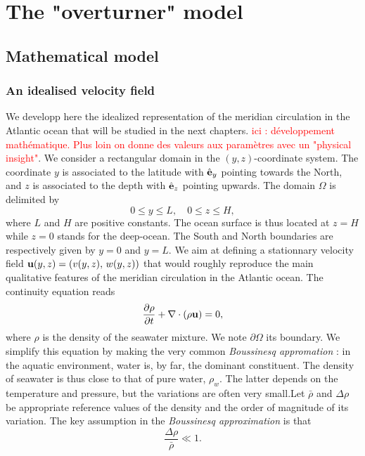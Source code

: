 \chapter{The "overturner" model}
\section{Mathematical model}
\subsection{An idealised velocity field}
We developp here the idealized representation of the meridian circulation in the Atlantic ocean that will be studied in the next chapters. \textcolor{red}{ici : développement mathématique. Plus loin on donne des valeurs aux paramètres avec un "physical insight"}. We consider a rectangular domain in the $(y,z)$-coordinate system. The coordinate $y$ is associated to the latitude with $\hat{\mathbf{e}}_y$ pointing towards the North, and $z$ is associated to the depth with $\hat{\mathbf{e}}_z$ pointing upwards. The domain $\Omega$ is delimited by
\begin{equation} 
	0 \le y \le L,\quad 0 \le z \le H,
\end{equation}
where $L$ and $H$ are positive constants. The ocean surface is thus located at $z = H$ while $z = 0$ stands for the deep-ocean. The South and North boundaries are respectively given by $y = 0$ and $y = L$. We aim at defining a stationnary velocity field $\mathbf u(y,z) = (v(y,z),\, w(y,z))$ that would roughly reproduce the main qualitative features of the meridian circulation in the Atlantic ocean. The continuity equation reads
\begin{equation} \label{eq:continuity}
	\frac{\partial \rho}{\partial t} + \nabla \cdot (\rho \mathbf u) = 0,
\end{equation}
where $\rho$ is the density of the seawater mixture. We note $\partial \Omega$ its boundary. We simplify this equation by making the very common \textit{Boussinesq appromation} : in the aquatic environment, water is, by far, the dominant constituent. The density of seawater is thus close to that of pure water, $\rho_w$. The latter depends on the temperature and pressure, but the variations are often very small.Let $\bar{\rho}$ and $\Delta\rho$ be appropriate reference values of the density and the order of magnitude of its variation. The key assumption in the \textit{Boussinesq approximation} is that
\begin{equation} \label{eq:bouss_hyp}
	\frac{\Delta \rho}{\bar{\rho}} \ll 1.
\end{equation}
